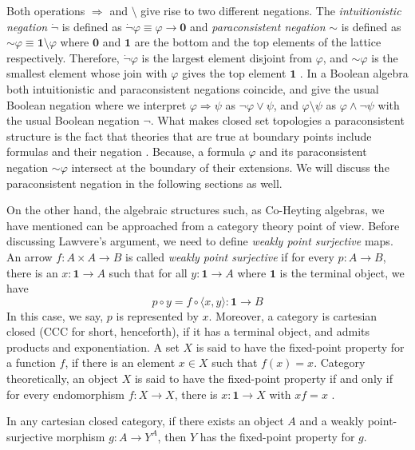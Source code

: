 \documentclass{article}
\begin{document}
Both operations $\Rightarrow$ and $\setminus$ give rise to two different negations. The \emph{intuitionistic negation} $\dot{\neg} $ is defined as $\dot{\neg} \varphi \equiv \varphi \rightarrow \mathbf{0}$ and \emph{paraconsistent negation} ${\sim}$ is defined as ${{\sim}}\varphi \equiv \mathbf{1} \setminus \varphi$ where $\mathbf{0}$ and $\mathbf{1}$ are the bottom and the top elements of the lattice respectively. Therefore, $\dot{\neg}  \varphi$ is the largest element disjoint from $\varphi$, and ${{\sim}}\varphi$ is the smallest element whose join with $\varphi$ gives the top element $\mathbf{1}$ \cite{rey}. In a Boolean algebra both intuitionistic and paraconsistent negations coincide, and give the usual Boolean negation where  we interpret $\varphi \Rightarrow \psi$ as $\neg \varphi \vee \psi$, and $\varphi \setminus \psi$ as $\varphi \wedge \neg \psi$ with the usual Boolean negation $\neg$. What makes closed set topologies a paraconsistent structure is the fact that theories that are true at boundary points include formulas and their negation \cite{mor,bas3}. Because, a formula $\varphi$ and its paraconsistent negation ${\sim}\varphi$ intersect at the boundary of their extensions. We will discuss the paraconsistent negation in the following sections as well.

On the other hand, the algebraic structures such, as Co-Heyting algebras, we have mentioned can be approached from a category theory point of view. Before discussing Lawvere's argument, we need to define \emph{weakly point surjective} maps. An arrow $f  : A \times A \rightarrow B$ is called \emph{weakly point surjective} if for every $p : A \rightarrow B$, there is an $x : \mathbf{1} \rightarrow A$ such that for all $y : \mathbf{1} \rightarrow A$ where $\mathbf{1}$ is the terminal object, we have $$p \circ y = f \circ \langle x, y \rangle: \mathbf{1} \rightarrow B$$
In this case, we say, $p$ is represented by $x$. Moreover, a category is cartesian closed (CCC for short, henceforth), if it has a terminal object, and admits products and exponentiation. A set $X$ is said to have the fixed-point property for a function $f$, if there is an element $x \in X$ such that $f(x) = x$. Category theoretically, an object $X$ is said to have the fixed-point property if and only if for every endomorphism $f : X \rightarrow X$, there is $x : \mathbf{1} \rightarrow X$ with $ x f = x$ \cite{law0}.

\begin{thm}{\label{law-ccc}}
In any cartesian closed category, if there exists an object $A$ and a weakly point-surjective morphism $g: A \rightarrow Y^{A}$, then $Y$ has the fixed-point property for $g$.
\end{thm}
\end{document}
